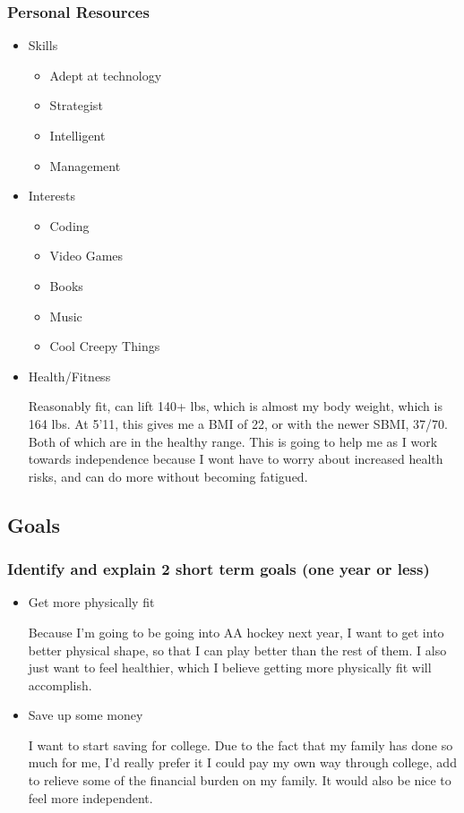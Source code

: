 \documentclass[11pt]{article}
\begin{document}
\subsubsection*{Personal Resources}
\label{sec:org2d8ab5e}
\begin{itemize}
\item Skills
\label{sec:org89b8621}

\begin{itemize}
\item Adept at technology
\item Strategist
\item Intelligent
\item Management
\end{itemize}

\item Interests
\label{sec:orgba34b2c}

\begin{itemize}
\item Coding
\item Video Games
\item Books
\item Music
\item Cool Creepy Things
\end{itemize}

\item Health/Fitness
\label{sec:orgca7d8a7}

Reasonably fit, can lift 140+ lbs, which is almost my body weight, which is 164 lbs. At 5'11, this gives me a BMI of 22, or with the newer SBMI, 37/70. Both of which are in the healthy range. This is going to help me as I work towards independence because I wont have to worry about increased health risks, and can do more without becoming fatigued.
\end{itemize}

\subsection*{Goals}
\label{sec:org62cb1e0}
\subsubsection*{Identify and explain 2 short term goals (one year or less)}
\label{sec:orgcd2a449}
\begin{itemize}
\item Get more physically fit
\label{sec:org565a22a}

Because I'm going to be going into AA hockey next year, I want to get into better physical shape, so that I can play better than the rest of them. I also just want to feel healthier, which I believe getting more physically fit will accomplish.

\item Save up some money
\label{sec:org8329687}

I want to start saving for college. Due to the fact that my family has done so much for me, I'd really prefer it I could pay my own way through college, add to relieve some of the financial burden on my family. It would also be nice to feel more independent.
\end{itemize}
\end{document}
